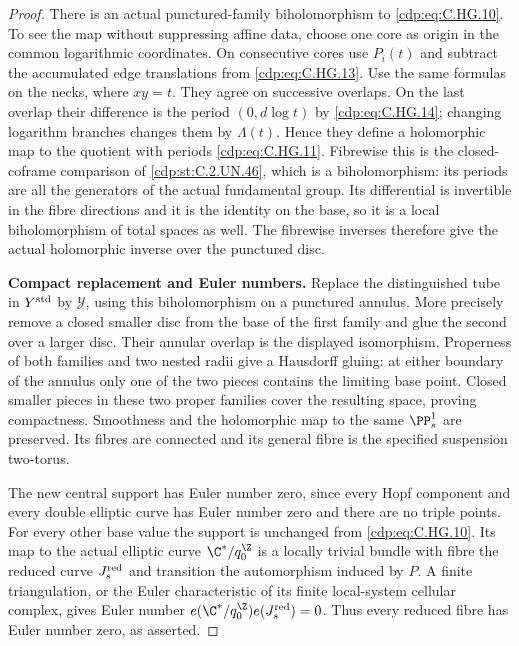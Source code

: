 \begin{proof}
There is an actual punctured-family
biholomorphism to \eqref{cdp:eq:C.HG.10}. To see the map
without suppressing affine data, choose one
core as origin in the common logarithmic
coordinates. On consecutive cores use
$P_i(t)$ and subtract the accumulated edge
translations from \eqref{cdp:eq:C.HG.13}. Use the same
formulas on the necks, where $xy=t$.
They agree on successive overlaps. On the
last overlap their difference is the
period $(0,d\log t)$ by \eqref{cdp:eq:C.HG.14};
changing logarithm branches changes them
by $\Lambda(t)$. Hence they define a
holomorphic map to the quotient with
periods \eqref{cdp:eq:C.HG.11}. Fibrewise this is the
closed-coframe comparison of \ref{cdp:st:C.2.UN.46},
which is a biholomorphism: its periods
are all the generators of the actual
fundamental group. Its differential is
invertible in the fibre directions and
it is the identity on the base, so it
is a local biholomorphism of total
spaces as well. The fibrewise inverses
therefore give the actual holomorphic
inverse over the punctured disc.

\par\medskip\noindent\textbf{Compact replacement and Euler numbers.}
Replace the distinguished tube in
$Y^{\rm std}$ by $\mathcal Y$, using this
biholomorphism on a punctured annulus.
More precisely remove a closed smaller
disc from the base of the first family
and glue the second over a larger disc.
Their annular overlap is the displayed
isomorphism. Properness of both families
and two nested radii give a Hausdorff
gluing: at either boundary of the annulus
only one of the two pieces contains the
limiting base point. Closed smaller
pieces in these two proper families
cover the resulting space, proving
compactness. Smoothness and the
holomorphic map to the same $\PP^1_s$
are preserved. Its fibres are connected
and its general fibre is the specified
suspension two-torus.

The new central support has Euler number
zero, since every Hopf component and every
double elliptic curve has Euler number
zero and there are no triple points.
For every other base value the support
is unchanged from \eqref{cdp:eq:C.HG.10}. Its map to
the actual elliptic curve $\C^*/q_0^{\Z}$
is a locally trivial bundle with fibre
the reduced curve $J_s^{\rm red}$ and
transition the automorphism induced by
$P$. A finite triangulation, or the
Euler characteristic of its finite
local-system cellular complex, gives
Euler number
$e(\C^*/q_0^{\Z})e(J_s^{\rm red})=0$.
Thus every reduced fibre has Euler
number zero, as asserted.


\end{proof}
